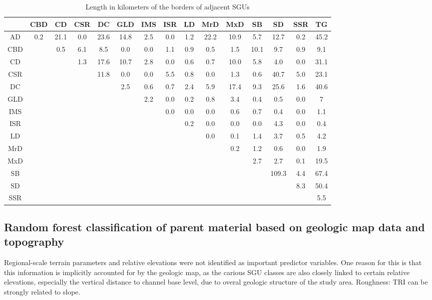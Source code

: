 \documentclass[preprint,12pt,authoryear]{elsarticle}
\begin{document}
\begin{table}[ht]
\centering
\tabcolsep=0.06cm
\small
\begin{tabular}{ccccccccccccccc}
  \hline
 & CBD & CD & CSR & DC & GLD & IMS & ISR & LD  & MrD & MxD & SB & SD & SSR & TG \\ 
  \hline
AD & 0.2 & 21.1 & 0.0 & 23.6 & 14.8 & 2.5 & 0.0 & 1.2  & 22.2 & 10.9 & 5.7 & 12.7 & 0.2 & 45.2 \\ 
  CBD &  & 0.5 & 6.1 & 8.5 & 0.0 & 0.0 & 1.1 & 0.9  & 0.5 & 1.5 & 10.1 & 9.7 & 0.9 & 9.1 \\ 
  CD &  &  & 1.3 & 17.6 & 10.7 & 2.8 & 0.0 & 0.6  & 0.7 & 10.0 & 5.8 & 4.0 & 0.0 & 31.1\\ 
  CSR &  &  &  & 11.8 & 0.0 & 0.0 & 5.5 & 0.8  & 0.0 & 1.3 & 0.6 & 40.7 & 5.0 & 23.1 \\ 
  DC &  &  &  &  & 2.5 & 0.6 & 0.7 & 2.4  & 5.9 & 17.4 & 9.3 & 25.6 & 1.6 & 40.6 \\ 
  GLD &  &  &  &  &  & 2.2 & 0.0 & 0.2  & 0.8 & 3.4 & 0.4 & 0.5 & 0.0 & 7 \\ 
  IMS &  &  &  &  &  &  & 0.0 & 0.0  & 0.0 & 0.6 & 0.7 & 0.4 & 0.0 & 1.1 \\ 
  ISR &  &  &  &  &  &  &  & 0.2 & 0.0 & 0.0 & 0.0 & 4.3 & 0.0 & 0.4 \\ 
  LD &  &  &  &  &  &  &  &   & 0.0 & 0.1 & 1.4 & 3.7 & 0.5 & 4.2 \\ 
  MrD  &  &  &  &  &  &  &  &  &  & 0.2 & 1.2 & 0.6 & 0.0 & 1.9 \\ 
  MxD  &  &  &  &  &  &  &  &  &  &  & 2.7 & 2.7 & 0.1 & 19.5 \\ 
  SB  &  &  &  &  &  &  &  &  &  &  &  & 109.3 & 4.4 & 67.4\\ 
  SD  &  &  &  &  &  &  &  &  &  &  &  &  & 8.3 & 50.4 \\ 
  SSR  &  &  &  &  &  &  &  &  &  &  &  &  &  & 5.5 \\ 
   \hline
\end{tabular}
\caption{Length in kilometers of the borders of adjacent SGUs} 
\label{table:borderlength}
\end{table}
\subsection{Random forest classification of parent material based on geologic map data and topography}
Regional-scale terrain parameters and relative elevations were not identified as important predictor variables. One reason for this is that this information is implicitly accounted for by the geologic map, as the carious SGU classes are also closely linked to certain relative elevations, especially the vertical distance to channel base level, due to overal geologic structure of the study area.
Roughness: TRI can be strongly related to slope.
\end{document}
